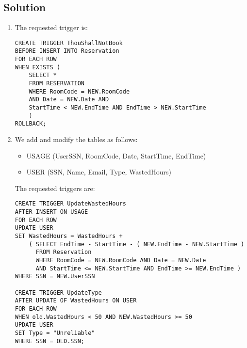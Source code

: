 \subsection*{Solution}
\begin{enumerate}
    \item The requested trigger is: 
        \begin{lstlisting}[style=SQL]
CREATE TRIGGER ThouShallNotBook
BEFORE INSERT INTO Reservation
FOR EACH ROW
WHEN EXISTS ( 
    SELECT *
    FROM RESERVATION
    WHERE RoomCode = NEW.RoomCode
    AND Date = NEW.Date AND
    StartTime < NEW.EndTime AND EndTime > NEW.StartTime 
    )
ROLLBACK;
        \end{lstlisting}
    \item We add and modify the tables as follows: 
        \begin{itemize}
            \item USAGE (UserSSN, RoomCode, Date, StartTime, EndTime)
            \item USER (SSN, Name, Email, Type, WastedHours)
        \end{itemize}
        The requested triggers are: 
        \begin{lstlisting}[style=SQL]
CREATE TRIGGER UpdateWastedHours
AFTER INSERT ON USAGE
FOR EACH ROW
UPDATE USER
SET WastedHours = WastedHours +
    ( SELECT EndTime - StartTime - ( NEW.EndTime - NEW.StartTime )
      FROM Reservation
      WHERE RoomCode = NEW.RoomCode AND Date = NEW.Date
      AND StartTime <= NEW.StartTime AND EndTime >= NEW.EndTime )
WHERE SSN = NEW.UserSSN

CREATE TRIGGER UpdateType
AFTER UPDATE OF WastedHours ON USER
FOR EACH ROW
WHEN old.WastedHours < 50 AND NEW.WastedHours >= 50
UPDATE USER
SET Type = "Unreliable"
WHERE SSN = OLD.SSN;
        \end{lstlisting}
\end{enumerate}